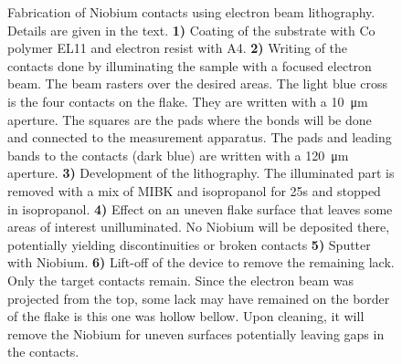 \documentclass[../main.tex]{subfiles}
\begin{document}
    \begin{figure}[H]
        \centering
    
        \hspace*{36pt}
        
        \vspace{36pt}

         
            \hspace*{20pt}
                    
            \hspace*{20pt}
        
            \vspace{36pt}
        
        
        \caption{Fabrication of Niobium contacts using electron beam lithography. Details are given in the text. \textbf{1)} Coating of the substrate with Co polymer EL11 and  electron resist with A4.
        \textbf{2)} Writing of the contacts done by illuminating the sample with a focused electron beam. The beam rasters over the desired areas. The light blue cross is the four contacts on the flake. They are 
        written with a \SI{10}{\micro\meter} aperture. The squares are the pads where the bonds will be done and connected to the measurement apparatus. The pads and leading bands to the contacts (dark blue)
        are written  with a \SI{120}{\micro\meter} aperture.  \textbf{3)} Development of the lithography. The illuminated part is removed with a mix of MIBK and isopropanol for 25s and stopped in 
        isopropanol.  \textbf{4)} Effect on an uneven flake surface that leaves some areas of interest unilluminated. No Niobium will be deposited there, potentially yielding discontinuities or broken contacts 
        \textbf{5)} Sputter with Niobium. \textbf{6)} Lift-off of the device to remove the remaining lack. Only the target contacts remain. Since the electron beam was projected from the top, some lack may have remained on the border of the flake is this one was hollow bellow.
        Upon cleaning, it will remove the Niobium for uneven surfaces potentially leaving gaps in the contacts.}
        \label{fig:litho}
    \end{figure}
\end{document}
